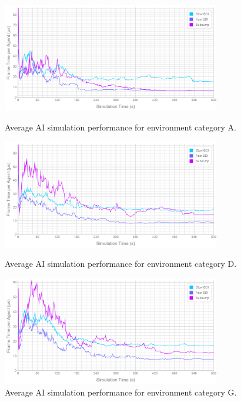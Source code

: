 \documentclass[a4paper,12pt]{article}
\begin{document}
\begin{figure}
\vspace{-20mm}
\centering
\includegraphics[width=0.85\textwidth]{../../Results/64_48_16/performance}
\caption{\small Average AI simulation performance for environment category A.}
\label{fig:64_48_16_per}

\vspace{5mm}
\includegraphics[width=0.85\textwidth]{../../Results/128_96_32/performance}
\caption{\small Average AI simulation performance for environment category D.}
\label{fig:64_96_32_per}

\vspace{5mm}
\includegraphics[width=0.85\textwidth]{../../Results/128_192_64/performance}
\caption{\small Average AI simulation performance for environment category G.}
\label{fig:128_192_64_per}
\end{figure}
\end{document}
